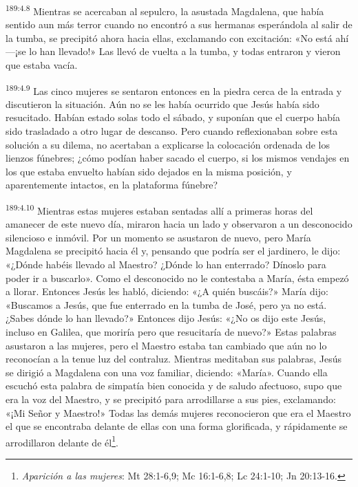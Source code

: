\par
\textsuperscript{189:4.8} Mientras se acercaban al sepulcro, la asustada Magdalena, que había sentido aun más terror cuando no encontró a sus hermanas esperándola al salir de la tumba, se precipitó ahora hacia ellas, exclamando con excitación: «No está ahí ---¡se lo han llevado!» Las llevó de vuelta a la tumba, y todas entraron y vieron que estaba vacía.

\par
\textsuperscript{189:4.9} Las cinco mujeres se sentaron entonces en la piedra cerca de la entrada y discutieron la situación. Aún no se les había ocurrido que Jesús había sido resucitado. Habían estado solas todo el sábado, y suponían que el cuerpo había sido trasladado a otro lugar de descanso. Pero cuando reflexionaban sobre esta solución a su dilema, no acertaban a explicarse la colocación ordenada de los lienzos fúnebres; ¿cómo podían haber sacado el cuerpo, si los mismos vendajes en los que estaba envuelto habían sido dejados en la misma posición, y aparentemente intactos, en la plataforma fúnebre?

\par
\textsuperscript{189:4.10} Mientras estas mujeres estaban sentadas allí a primeras horas del amanecer de este nuevo día, miraron hacia un lado y observaron a un desconocido silencioso e inmóvil. Por un momento se asustaron de nuevo, pero María Magdalena se precipitó hacia él y, pensando que podría ser el jardinero, le dijo: «¿Dónde habéis llevado al Maestro? ¿Dónde lo han enterrado? Dínoslo para poder ir a buscarlo». Como el desconocido no le contestaba a María, ésta empezó a llorar. Entonces Jesús les habló, diciendo: «¿A quién buscáis?» María dijo: «Buscamos a Jesús, que fue enterrado en la tumba de José, pero ya no está. ¿Sabes dónde lo han llevado?» Entonces dijo Jesús: «¿No os dijo este Jesús, incluso en Galilea, que moriría pero que resucitaría de nuevo?» Estas palabras asustaron a las mujeres, pero el Maestro estaba tan cambiado que aún no lo reconocían a la tenue luz del contraluz. Mientras meditaban sus palabras, Jesús se dirigió a Magdalena con una voz familiar, diciendo: «María». Cuando ella escuchó esta palabra de simpatía bien conocida y de saludo afectuoso, supo que era la voz del Maestro, y se precipitó para arrodillarse a sus pies, exclamando: «¡Mi Señor y Maestro!» Todas las demás mujeres reconocieron que era el Maestro el que se encontraba delante de ellas con una forma glorificada, y rápidamente se arrodillaron delante de él\footnote{\textit{Aparición a las mujeres}: Mt 28:1-6,9; Mc 16:1-6,8; Lc 24:1-10; Jn 20:13-16.}.

